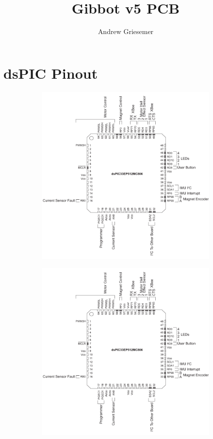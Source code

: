 \documentclass{article}
\begin{document}
\title{Gibbot v5 PCB}
\author{Andrew Griesemer}
\maketitle
\tableofcontents
\newpage
\section{dsPIC Pinout}
\begin{figure}[h!]

	\centering
	\begin{subfigure}{0.4\textwidth}
		\includegraphics[width=\textwidth, page=1]{breakout}
		\label{pinout1}
	\end{subfigure}
	\begin{subfigure}{0.4\textwidth}
		\includegraphics[width=\textwidth, page=2]{breakout}

\end{subfigure}
\end{figure}
\end{document}
